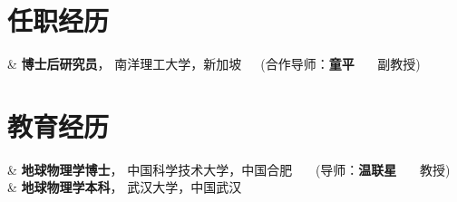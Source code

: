 \section{任职经历}



\begin{EntriesTable}
    &
  \textbf{博士后研究员}， 南洋理工大学，新加坡\ \ \ (合作导师：\textbf{童平} \ \ \ 副教授)
\end{EntriesTable}




\section{教育经历}


\begin{EntriesTable}
    &
  \textbf{地球物理学博士}， 中国科学技术大学，中国合肥 \ \ \ (导师：\textbf{温联星} \ \ \ 教授)
  \\
    &
  \textbf{地球物理学本科}， 武汉大学，中国武汉
\end{EntriesTable}
